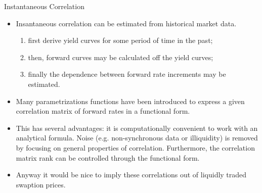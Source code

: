 \documentclass{beamer}
\begin{document}
\begin{frame}{Instantaneous Correlation}
  \begin{itemize}    
  \item<1-> Insantaneous correlation can be estimated from historical market data.
  \begin{enumerate}
	  \item first derive yield curves for some period of time in the past;
	  \item then, forward curves may be calculated off the yield curves;
	  \item finally the dependence between forward rate increments may be estimated. 
  \end{enumerate}
  \item<2-> Many parametrizations functions have been introduced to express a given correlation matrix of forward rates in a functional form.
  \item<3-> This has several advantages: it is computationally convenient to work with an analytical formula. Noise (e.g. non-synchronous data or illiquidity) is removed by focusing on general properties of correlation. Furthermore, the correlation matrix rank can be controlled through the functional form.
  \item<4-> Anyway it would be nice to imply these correlations out of liquidly traded swaption prices. 
  \end{itemize}
\end{frame}

\end{document}
